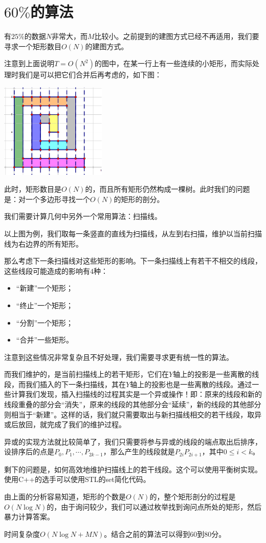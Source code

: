 \documentclass[a4paper]{article}
\begin{document}
\section{$60\%$的算法}
有$25\%$的数据$N$非常大，而$M$比较小。之前提到的建图方式已经不再适用，我们要寻求一个矩形数目$O(N)$的建图方式。 \par
注意到上面说明$T=O(N^2)$的图中，在某一行上有一些连续的小矩形，而实际处理时我们是可以把它们合并后再考虑的，如下图：
\begin{center}
\includegraphics[height=128pt]{maze_3.eps}
\end{center}
\par
此时，矩形数目是$O(N)$的，而且所有矩形仍然构成一棵树。此时我们的问题是：对一个多边形寻找一个$O(N)$的矩形的剖分。 \par
我们需要计算几何中另外一个常用算法：扫描线。 \par
以上图为例，我们取每一条竖直的直线为扫描线，从左到右扫描，维护以当前扫描线为右边界的所有矩形。 \par
那么考虑下一条扫描线对这些矩形的影响。下一条扫描线上有若干不相交的线段，这些线段可能造成的影响有$4$种：
\begin{itemize}
\item “新建”一个矩形；
\item “终止”一个矩形；
\item “分割”一个矩形；
\item “合并”一些矩形。
\end{itemize}
\par
注意到这些情况非常复杂且不好处理，我们需要寻求更有统一性的算法。 \par
而我们维护的，是当前扫描线上的若干矩形，它们在$Y$轴上的投影是一些离散的线段，而我们插入的下一条扫描线，其在$Y$轴上的投影也是一些离散的线段。通过一些计算我们发现，插入扫描线的过程其实是一个异或操作！即：原来的线段和新的线段重叠的部分会“消失”，原来的线段的其他部分会“延续”，新的线段的其他部分则相当于“新建”。这样的话，我们就只需要取出与新扫描线相交的若干线段，取异或后放回，就完成了我们的维护过程。 \par
异或的实现方法就比较简单了，我们只需要将参与异或的线段的端点取出后排序，设排序后的点是$P_0,P_1,\cdots,P_{2k-1}$，那么产生的线段就是$P_{2i}P_{2i+1}$，其中$0\le i <k$。 \par
剩下的问题是，如何高效地维护扫描线上的若干线段。这个可以使用平衡树实现。使用C++的选手可以使用STL的set简化代码。 \par
由上面的分析容易知道，矩形的个数是$O(N)$的，整个矩形剖分的过程是$O(N\log{N})$的，由于询问较少，我们可以通过枚举找到询问点所处的矩形，然后暴力计算答案。 \par
时间复杂度$O(N\log{N}+MN)$。结合之前的算法可以得到$60$到$80$分。
\end{document}
